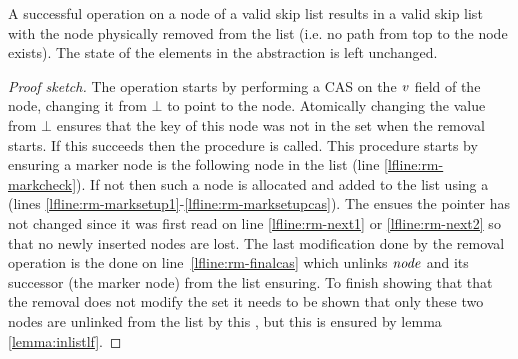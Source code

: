 \begin{lemma}
\label{lemma:removelf}
A successful  operation on a node of a valid skip list results in a valid skip list
with the node physically removed from the list (i.e. no path from top to the node exists).  The state of the elements in the abstraction is left unchanged.
\end{lemma}
\begin{proof}[Proof sketch]
The operation starts by performing a CAS on the $\ms{v}$ field of the node, changing it
from $\bot$ to point to the node.
Atomically changing the value from $\bot$ ensures that the key of this node was not in the set when the removal starts.
If this \CAS{} succeeds then the  procedure is called.
This procedure starts by ensuring a marker node is the following node in the list (line \ref{lfline:rm-markcheck}).
If not then such a node is allocated and added to the list using a \CAS{} (lines \ref{lfline:rm-marksetup1}-\ref{lfline:rm-marksetupcas}).
The \CAS{} ensues the pointer has not changed since it was first read on line \ref{lfline:rm-next1} or \ref{lfline:rm-next2}
so that no newly inserted nodes are lost.
The last modification done by the removal operation is the \CAS{} done on
line~\ref{lfline:rm-finalcas} which unlinks $\ms{node}$ and its successor (the marker node) from the list ensuring.
To finish showing that that the removal does not modify the set it needs to be shown that only these two nodes are
unlinked from the list by this \CAS{}, but this is ensured by lemma \ref{lemma:inlistlf}.
\end{proof}


